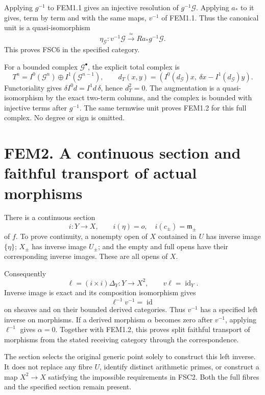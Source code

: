 Applying \(g^{-1}\) to FEM1.1 gives an injective resolution of
\(g^{-1}\mathcal G\). Applying \(a_*\) to it gives, term by term and
with the same maps, \(v^{-1}\) of FEM1.1. Thus the canonical unit is a
quasi-isomorphism \[
\boxed{\eta_{\mathcal G}:v^{-1}\mathcal G
 \xrightarrow{\ \simeq\ }Ra_*g^{-1}\mathcal G.}
\tag{FEM1.2}
\] This proves FSC6 in the specified category.

For a bounded complex \(\mathcal G^\bullet\), the explicit total complex
is \[
T^n=I^0(\mathcal G^n)\oplus I^1(\mathcal G^{n-1}),\qquad
d_T(x,y)=(I^0(d_{\mathcal G})x,\ \delta x-I^1(d_{\mathcal G})y).
\tag{FEM1.3}
\] Functoriality gives \(\delta I^0d=I^1d\,\delta\), hence \(d_T^2=0\).
The augmentation is a quasi-isomorphism by the exact two-term columns,
and the complex is bounded with injective terms after \(g^{-1}\). The
same termwise unit proves FEM1.2 for this full complex. No degree or
sign is omitted.

\section{FEM2. A continuous section and faithful transport of actual
morphisms}\label{fem2.-a-continuous-section-and-faithful-transport-of-actual-morphisms}

There is a continuous section \[
i:Y\to X,\qquad i(\eta)=o,\quad i(c_\pm)=\mathfrak m_\pm
\] of \(f\). To prove continuity, a nonempty open of \(X\) contained in
\(U\) has inverse image \(\{\eta\}\); \(X_\pm\) has inverse image
\(U_\pm\); and the empty and full opens have their corresponding inverse
images. These are all opens of \(X\).

Consequently \[
\ell=(i\times i)\Delta_Y:Y\to X^2,\qquad v\ell=\operatorname{id}_Y.
\tag{FEM2.1}
\] Inverse image is exact and its composition isomorphism gives \[
\ell^{-1}v^{-1}=\operatorname{id}
\] on sheaves and on their bounded derived categories. Thus \(v^{-1}\)
has a specified left inverse on morphisms. If a derived morphism
\(\alpha\) becomes zero after \(v^{-1}\), applying \(\ell^{-1}\) gives
\(\alpha=0\). Together with FEM1.2, this proves split faithful transport
of morphisms from the stated receiving category through the
correspondence.

The section selects the original generic point solely to construct this
left inverse. It does not replace any fibre \(U\), identify distinct
arithmetic primes, or construct a map \(X^2\to X\) satisfying the
impossible requirements in FSC2. Both the full fibres and the specified
section remain present.

